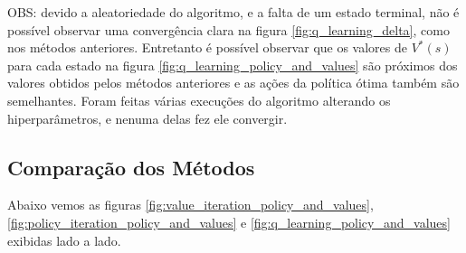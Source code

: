 OBS: devido a aleatoriedade do algoritmo, e a falta de um estado terminal, não é possível observar uma convergência clara na figura \ref{fig:q_learning_delta}, como nos métodos anteriores. Entretanto é possível observar que os valores de \( V^* (s) \) para cada estado na figura \ref{fig:q_learning_policy_and_values} são próximos dos valores obtidos pelos métodos anteriores e as ações da política ótima também são semelhantes. Foram feitas várias execuções do algoritmo alterando os hiperparâmetros, e nenuma delas fez ele convergir.

\subsection*{Comparação dos Métodos}

Abaixo vemos as figuras \ref{fig:value_iteration_policy_and_values}, \ref{fig:policy_iteration_policy_and_values} e \ref{fig:q_learning_policy_and_values} exibidas lado a lado.

